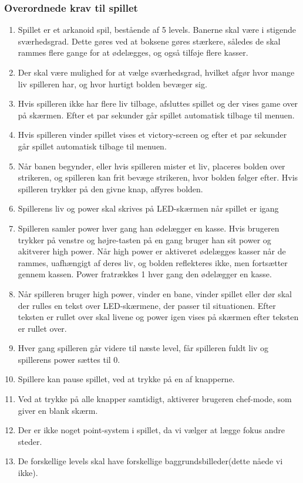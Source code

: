 \subsubsection{Overordnede krav til spillet}
\begin{enumerate}
\item Spillet er et arkanoid spil, bestående af 5 levels. Banerne skal være i stigende sværhedsgrad. Dette gøres ved at boksene gøres stærkere, således de skal rammes flere gange for at ødelægges, og også tilføje flere kasser.
\item Der skal være mulighed for at vælge sværhedsgrad, hvilket afgør hvor mange liv spilleren har, og hvor hurtigt bolden bevæger sig.
\item Hvis spilleren ikke har flere liv tilbage, afsluttes spillet og der vises game over på skærmen. Efter et par sekunder går spillet automatisk tilbage  til menuen.
\item Hvis spilleren vinder spillet vises et victory-screen og efter et par sekunder går spillet automatisk tilbage til menuen.
\item Når banen begynder, eller hvis spilleren mister et liv, placeres bolden over strikeren, og spilleren kan frit bevæge strikeren, hvor bolden følger efter. Hvis spilleren trykker på den givne knap, affyres bolden.
\item Spillerens liv og power skal skrives på LED-skærmen når spillet er igang
\item Spilleren samler power hver gang han ødelægger en kasse. Hvis brugeren trykker på venstre og højre-tasten på en gang bruger han sit power og akitverer high power. Når high power er aktiveret ødelægges kasser når de rammes, uafhængigt af deres liv, og bolden reflekteres ikke, men fortsætter gennem kassen. Power fratrækkes 1 hver gang den ødelægger en kasse.
\item Når spilleren bruger high power, vinder en bane, vinder spillet eller dør skal der rulles en tekst over LED-skærmene, der passer til situationen. Efter teksten er rullet over skal livene og power igen vises på skærmen efter teksten er rullet over.
\item Hver gang spilleren går videre til næste level, får spilleren fuldt liv og spillerens power sættes til 0.
\item Spillere kan pause spillet, ved at trykke på en af knapperne.
\item Ved at trykke på alle knapper samtidigt, aktiverer brugeren chef-mode, som giver en blank skærm.  
\item Der er ikke noget point-system i spillet, da vi vælger at lægge fokus andre steder.
\item De forskellige levels skal have forskellige baggrundsbilleder(dette nåede vi ikke).
\end{enumerate}

